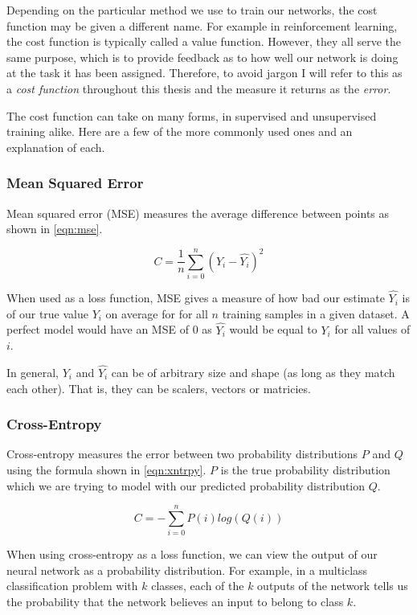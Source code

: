 Depending on the particular method we use to train our networks, the cost function may be given a different name. For example in reinforcement learning, the cost function is typically called a value function. However, they all serve the same purpose, which is to provide feedback as to how well our network is doing at the task it has been assigned. Therefore, to avoid jargon I will refer to this as a \textit{cost function} throughout this thesis and the measure it returns as the \textit{error}.

The cost function can take on many forms, in supervised and unsupervised training alike. Here are a few of the more commonly used ones and an explanation of each.

\subsubsection{Mean Squared Error}
Mean squared error (MSE) measures the average difference between points as shown in \autoref{eqn:mse}.

\begin{equation} \label{eqn:mse}
C = \frac{1}{n}\sum_{i=0}^{n} (Y_i - \hat{Y_i})^2
\end{equation}

When used as a loss function, MSE gives a measure of how bad our estimate $\hat{Y_i}$ is of our true value $Y_i$ on average for for all $n$ training samples in a given dataset. A perfect model would have an MSE of 0 as $\hat{Y_i}$ would be equal to $Y_i$ for all values of $i$.

In general, $Y_i$ and $\hat{Y_i}$ can be of arbitrary size and shape (as long as they match each other). That is, they can be scalers, vectors or matricies.

\subsubsection{Cross-Entropy}
Cross-entropy measures the error between two probability distributions $P$ and $Q$ using the formula shown in \autoref{eqn:xntrpy}. $P$ is the true probability distribution which we are trying to model with our predicted probability distribution $Q$.

\begin{equation} \label{eqn:xntrpy}
C = -\sum_{i=0}^{n}P(i) log(Q(i))
\end{equation}

When using cross-entropy as a loss function, we can view the output of our neural network as a probability distribution. For example, in a multiclass classification problem with $k$ classes, each of the $k$ outputs of the network tells us the probability that the network believes an input to belong to class $k$.


